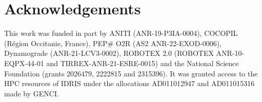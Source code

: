 \section*{Acknowledgements}
This work was funded in part by ANITI (ANR-19-P3IA-0004), COCOPIL (R{\'e}gion Occitanie, France), PEP\# O2R (AS2 ANR-22-EXOD-0006), Dynamograde (ANR-21-LCV3-0002), ROBOTEX 2.0 (ROBOTEX ANR-10-EQPX-44-01 and TIRREX-ANR-21-ESRE-0015) and the National Science Foundation (grants 2026479, 2222815 and 2315396).
It was granted access to the HPC resources of IDRIS under the allocations AD011012947 and AD011015316 made by GENCI.